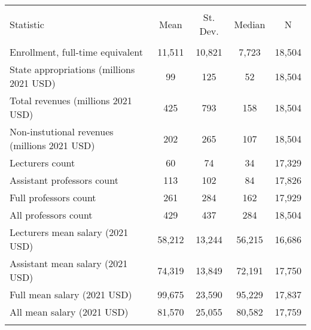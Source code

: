 
\begin{tabular}{@{\extracolsep{5pt}}lcccc} 
\\[-1.8ex]\hline 
\hline \\[-1.8ex] 
Statistic & \multicolumn{1}{c}{Mean} & \multicolumn{1}{c}{St. Dev.} & \multicolumn{1}{c}{Median} & \multicolumn{1}{c}{N} \\ 
\hline \\[-1.8ex] 
Enrollment, full-time equivalent & 11,511 & 10,821 & 7,723 & 18,504 \\ 
State appropriations (millions 2021 USD) & 99 & 125 & 52 & 18,504 \\ 
Total revenues (millions 2021 USD) & 425 & 793 & 158 & 18,504 \\ 
Non-instutional revenues (millions 2021 USD) & 202 & 265 & 107 & 18,504 \\ 
Lecturers count & 60 & 74 & 34 & 17,329 \\ 
Assistant professors count & 113 & 102 & 84 & 17,826 \\ 
Full professors count & 261 & 284 & 162 & 17,929 \\ 
All professors count & 429 & 437 & 284 & 18,504 \\ 
Lecturers mean salary (2021 USD) & 58,212 & 13,244 & 56,215 & 16,686 \\ 
Assistant mean salary (2021 USD) & 74,319 & 13,849 & 72,191 & 17,750 \\ 
Full mean salary (2021 USD) & 99,675 & 23,590 & 95,229 & 17,837 \\ 
All mean salary (2021 USD) & 81,570 & 25,055 & 80,582 & 17,759 \\ 
\hline \\[-1.8ex] 
\end{tabular} 
